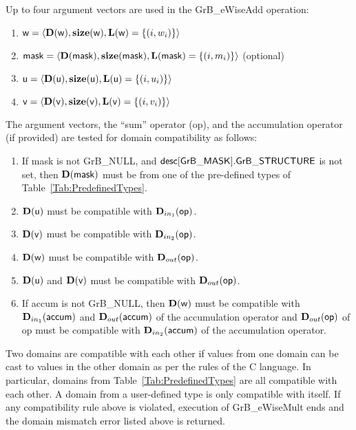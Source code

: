 Up to four argument vectors are used in the {\sf GrB\_eWiseAdd} operation:
\begin{enumerate}
	\item ${\sf w} = \langle \bold{D}({\sf w}),\bold{size}({\sf w}),\bold{L}({\sf w}) = \{(i,w_i) \} \rangle$
	\item ${\sf mask} = \langle \bold{D}({\sf mask}),\bold{size}({\sf mask}),\bold{L}({\sf mask}) = \{(i,m_i) \} \rangle$ (optional)
	\item ${\sf u} = \langle \bold{D}({\sf u}),\bold{size}({\sf u}),\bold{L}({\sf u}) = \{(i,u_i) \} \rangle$
	\item ${\sf v} = \langle \bold{D}({\sf v}),\bold{size}({\sf v}),\bold{L}({\sf v}) = \{(i,v_i) \} \rangle$
\end{enumerate}

The argument vectors, the ``sum'' operator ({\sf op}), and the accumulation 
operator (if provided) are tested for domain compatibility as follows:
\begin{enumerate}
	\item If {\sf mask} is not {\sf GrB\_NULL}, and ${\sf desc[GrB\_MASK].GrB\_STRUCTURE}$
    is not set, then $\bold{D}({\sf mask})$ must be from one of the pre-defined types of 
    Table~\ref{Tab:PredefinedTypes}.

	\item $\bold{D}({\sf u})$ must be compatible with $\mbox{$\mathbf{D}_{in_{1}}$}({\sf op})$.

	\item $\bold{D}({\sf v})$ must be compatible with $\mbox{$\mathbf{D}_{in_{2}}$}({\sf op})$.

	\item $\bold{D}({\sf w})$ must be compatible with $\mbox{$\mathbf{D}_{out}$}({\sf op})$.

	\item $\bold{D}({\sf u})$ and $\bold{D}({\sf v})$ must be compatible with $\mbox{$\mathbf{D}_{out}$}({\sf op})$.

	\item If {\sf accum} is not {\sf GrB\_NULL}, then $\bold{D}({\sf w})$ must be
    compatible with $\mbox{$\mathbf{D}_{in_{1}}$}({\sf accum})$ and $\mbox{$\mathbf{D}_{out}$}({\sf accum})$ of the accumulation operator and $\mbox{$\mathbf{D}_{out}$}({\sf op})$ of
    {\sf op} must be compatible with $\mbox{$\mathbf{D}_{in_{2}}$}({\sf accum})$ of the accumulation operator.
\end{enumerate}
Two domains are compatible with each other if values from one domain can be cast 
to values in the other domain as per the rules of the C language.
In particular, domains from Table~\ref{Tab:PredefinedTypes} are all compatible 
with each other. A domain from a user-defined type is only compatible with itself.
If any compatibility rule above is violated, execution of {\sf GrB\_eWiseMult} ends
and the domain mismatch error listed above is returned.

